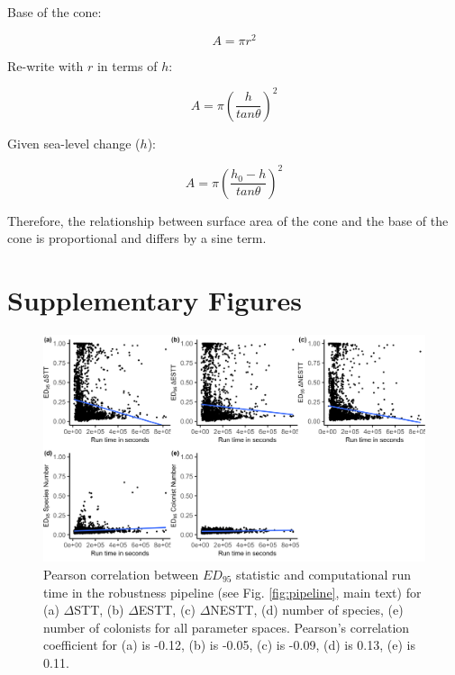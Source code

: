 Base of the cone: 

\[ A = \pi r^2 \]

Re-write with $r$ in terms of $h$:

\[ A = \pi \left( \frac{h}{tan \theta} \right)^2 \]

Given sea-level change ($h$): 

\[ A = \pi \left( \frac{h_0 - h}{tan \theta} \right) ^2 \]

Therefore, the relationship between surface area of the cone and the base of the cone is proportional and differs by a sine term.

\clearpage

\section*{Supplementary Figures}

\begin{figure}[ht]
    \centering
    \includegraphics[width=\textwidth]{JBI-21-0508_FigS1.png}
    \caption{Pearson correlation between $ED_{95}$ statistic and computational run time in the robustness pipeline (see Fig. \ref{fig:pipeline}, main text) for (a) $\Delta$STT, (b) $\Delta$ESTT, (c) $\Delta$NESTT, (d) number of species, (e) number of colonists for all parameter spaces. Pearson’s correlation coefficient for (a) is -0.12, (b) is -0.05, (c) is -0.09, (d) is 0.13, (e) is 0.11.}
    \label{fig:runtime_ed95_corr}
\end{figure}

